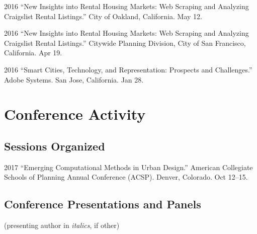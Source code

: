 \documentclass{academiccv}
\begin{document}
\begin{tablist}
\item[2016] \tab \enquote{New Insights into Rental Housing Markets: Web Scraping and Analyzing Craigslist Rental Listings.} City of Oakland, California. May 12.

\item[2016] \tab \enquote{New Insights into Rental Housing Markets: Web Scraping and Analyzing Craigslist Rental Listings.} Citywide Planning Division, City of San Francisco, California. Apr 19.

\item[2016] \tab \enquote{Smart Cities, Technology, and Representation: Prospects and Challenges.} Adobe Systems. San Jose, California. Jan 28.

\end{tablist}



\section*{Conference Activity}

\subsection*{Sessions Organized}

\begin{tablist}
	
\item[2017] \tab \enquote{Emerging Computational Methods in Urban Design.} American Collegiate Schools of Planning Annual Conference (ACSP). Denver, Colorado. Oct 12--15.
	
\end{tablist}

\subsection*{Conference Presentations and Panels}

(presenting author in \textit{italics}, if other)\bigskip
\end{document}

